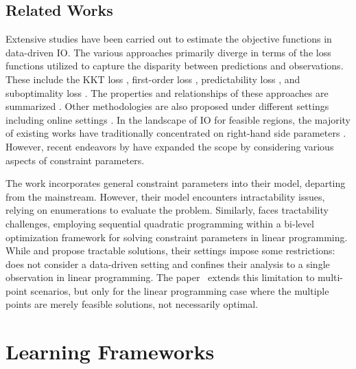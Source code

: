 \documentclass{article}
\theoremstyle{plain}
\begin{document}
\subsection{Related Works}
Extensive studies have been carried out to estimate the objective functions in data-driven IO. The various approaches primarily diverge in terms of the loss functions utilized to capture the disparity between predictions and observations. These include the KKT loss \cite{keshavarz2011imputing}, first-order loss \cite{bertsimas2015data}, predictability loss \cite{aswani2018inverse}, and suboptimality loss \cite{mohajerin2018data}. The properties and relationships of these approaches are summarized \cite{mohajerin2018data}. Other methodologies are also proposed under different settings including online settings \cite{barmann2017emulating, dong2018generalized}. In the landscape of IO for feasible regions, the majority of existing works have traditionally concentrated on right-hand side parameters \cite{dempe2006inverse, guler2010capacity, xu2016data, saez2016data, lu2018data}. However, recent endeavors by \cite{aswani2018inverse,tan2020learning,ghobadi2020inferring} have expanded the scope by considering various aspects of constraint parameters.


The work \cite{aswani2018inverse}  incorporates general constraint parameters into their model, departing from the mainstream.  However, their model encounters intractability issues, relying on enumerations to evaluate the problem. Similarly, \cite{tan2020learning} faces tractability challenges, employing sequential quadratic programming within a bi-level optimization framework for solving constraint parameters in linear programming. While \cite{chan2020inverse} and \cite{ghobadi2020inferring} propose tractable solutions, their settings impose some restrictions: \cite{chan2020inverse} does not consider a data-driven setting and confines their analysis to a single observation in linear programming. The paper~\cite{ghobadi2020inferring} extends this limitation to multi-point scenarios, but only for the linear programming case where the multiple points are merely feasible solutions, not necessarily optimal.

\section{Learning Frameworks}\label{sec:loss}
\end{document}
